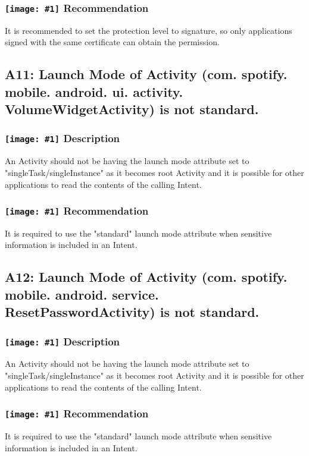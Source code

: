 \documentclass[12p]{article}
\newcommand{\icon}[1]{\texttt{[image: \#1]}}
\begin{document}
\subsubsection*{\protect\icon{/home/miki/Documents/GITHUB/AndroidPermissions/python/vulns/report_icons/basic_todo.png} Recommendation}
It is recommended to set the protection level to signature, so only applications signed with the same certificate can obtain the permission.
\subsection{A11: Launch Mode of Activity (com. spotify. mobile. android. ui. activity. VolumeWidgetActivity) is not standard.}
\subsubsection*{\protect\icon{/home/miki/Documents/GITHUB/AndroidPermissions/python/vulns/report_icons/basic_sheet.png} Description}
An Activity should not be having the launch mode attribute set to "singleTask/singleInstance" as it becomes root Activity and it is possible for other applications to read the contents of the calling Intent.
\subsubsection*{\protect\icon{/home/miki/Documents/GITHUB/AndroidPermissions/python/vulns/report_icons/basic_todo.png} Recommendation}
It is required to use the "standard" launch mode attribute when sensitive information is included in an Intent.
\subsection{A12: Launch Mode of Activity (com. spotify. mobile. android. service. ResetPasswordActivity) is not standard.}
\subsubsection*{\protect\icon{/home/miki/Documents/GITHUB/AndroidPermissions/python/vulns/report_icons/basic_sheet.png} Description}
An Activity should not be having the launch mode attribute set to "singleTask/singleInstance" as it becomes root Activity and it is possible for other applications to read the contents of the calling Intent.
\subsubsection*{\protect\icon{/home/miki/Documents/GITHUB/AndroidPermissions/python/vulns/report_icons/basic_todo.png} Recommendation}
It is required to use the "standard" launch mode attribute when sensitive information is included in an Intent.
\end{document}
